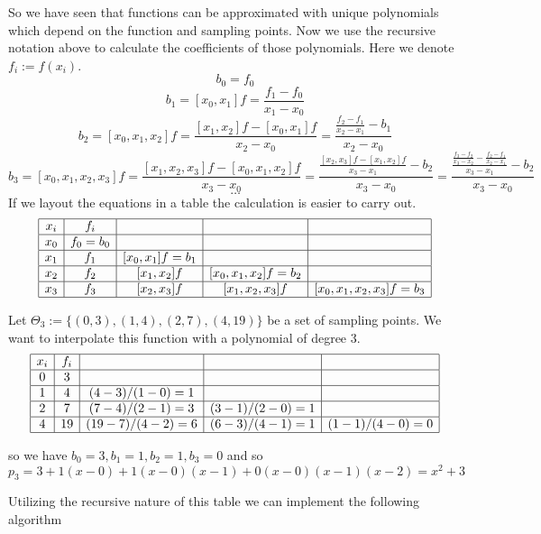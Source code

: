 So we have seen that functions can be approximated with unique polynomials which depend on the function and sampling points.
Now we use the recursive notation above to calculate the coefficients of those polynomials.
Here we denote \(f_i := f(x_i)\).
\[b_0 = f_0\]
\[b_1 = [x_0, x_1]f = \frac{f_1 - f_0}{x_1 - x_0}\]
\[b_2 = [x_0, x_1, x_2]f = \frac{[x_1, x_2]f - [x_0, x_1]f}{x_2 - x_0} = \frac{\frac{f_2 - f_1}{x_2 - x_1} - b_1}{x_2 - x_0}\]
\[b_3 = [x_0, x_1, x_2, x_3]f = \frac{[x_1, x_2, x_3]f - [x_0, x_1, x_2]f}{x_3 - x_0} = \frac{\frac{[x_2, x_3]f - [x_1, x_2]f}{x_3 - x_1} - b_2}{x_3 - x_0} = \frac{\frac{\frac{f_3 - f_2}{x_3 - x_2} - \frac{f_2 - f_1}{x_2 - x_1}}{x_3 - x_1} - b_2}{x_3 - x_0}\]
\[\ldots\]
If we layout the equations in a table the calculation is easier to carry out.
\[
   \begin{array}{|c|c|c|c|c|}
      \hline
      x_i & f_i & & &\\
      \hline
      x_0 & f_0 = b_0 & & &\\
      \hline
      x_1 & f_1 & [x_0, x_1]f = b_1 & &\\
      \hline
      x_2 & f_2 & [x_1, x_2]f & [x_0, x_1, x_2]f = b_2 & \\
      \hline
      x_3 & f_3 & [x_2, x_3]f & [x_1, x_2, x_3]f & [x_0, x_1, x_2, x_3]f = b_3\\
      \hline
   \end{array}
\]
\begin{example}
   Let \(\Theta_3 := \{(0, 3), (1, 4), (2, 7), (4, 19)\}\) be a set of sampling points.
   We want to interpolate this function with a polynomial of degree 3.
   \[
      \begin{array}{|c|c|c|c|c|}
         \hline
         x_i & f_i & & &\\
         \hline
         0 & 3 & & &\\
         \hline
         1 & 4 & (4-3)/(1-0) = 1 & & \\
         \hline
         2 & 7 & (7-4)/(2-1) = 3 & (3-1)/(2-0) = 1 &\\
         \hline
         4 & 19 & (19-7)/(4-2) = 6 & (6-3)/(4-1) = 1 & (1-1)/(4-0) = 0\\
         \hline
      \end{array}
   \]
\end{example}
so we have \(b_0 = 3, b_1 = 1, b_2 = 1, b_3 = 0\) and so
\[p_3 = 3 + 1(x-0) + 1(x-0)(x-1) + 0(x-0)(x-1)(x-2) = x^2 + 3\]

Utilizing the recursive nature of this table we can implement the following algorithm


